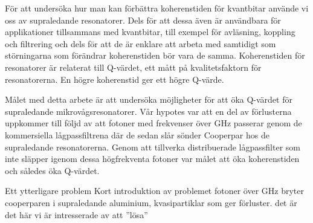\documentclass[main.tex]{subfiles}
\begin{document}
För att undersöka hur man kan förbättra koherenstiden för kvantbitar använde vi oss av supraledande resonatorer. Dels för att dessa även är användbara för applikationer tillsammans med kvantbitar, till exempel för avläsning, koppling och filtrering \cite{placeholder} och dels för att de är enklare att arbeta med samtidigt som störningarna som förändrar koherenstiden bör vara de samma\cite{Oliver2013}. Koherenstiden för resonatorer är relaterat till Q-värdet, ett mått på kvalitetsfaktorn för resonatorerna. En högre koherenstid ger ett högre Q-värde.


Målet med detta arbete är att undersöka möjligheter för att öka Q-värdet för supraledande mikrovågsresonatorer. Vår hypotes var att en del av förlusterna uppkommer till följd av att fotoner med frekvenser över \unit[100]{GHz} passerar genom de kommersiella lågpassfiltrena där de sedan slår sönder Cooperpar hos de supraledande resonatorerna. Genom att tillverka distribuerade lågpassfilter som inte släpper igenom dessa högfrekventa fotoner var målet att öka koherenstiden och således öka Q-värdet.








Ett ytterligare problem Kort introduktion av problemet
fotoner över \unit[88]{GHz} bryter cooperparen i supraledande aluminium, kvasipartiklar som ger förluster.
det är det här vi är intresserade av att ''lösa''
\end{document}
